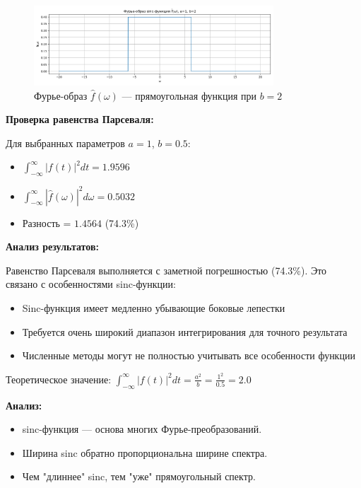 \begin{figure}[H]
    \centering
    \includegraphics[width=0.8\textwidth]{python/sinc_fourier_b2.png}
    \caption{Фурье-образ $\hat{f}(\omega)$ — прямоугольная функция при $b = 2$}
\end{figure}

\textbf{Проверка равенства Парсеваля:}

Для выбранных параметров $a = 1$, $b = 0.5$:
\begin{itemize}
    \item $\displaystyle \int_{-\infty}^{\infty} |f(t)|^2 dt = 1.9596$
    \item $\displaystyle \int_{-\infty}^{\infty} |\hat{f}(\omega)|^2 d\omega = 0.5032$
    \item Разность = $1.4564$ (74.3\%)
\end{itemize}

\textbf{Анализ результатов:}

Равенство Парсеваля выполняется с заметной погрешностью (74.3\%). Это связано с особенностями sinc-функции:
\begin{itemize}
    \item Sinc-функция имеет медленно убывающие боковые лепестки
    \item Требуется очень широкий диапазон интегрирования для точного результата
    \item Численные методы могут не полностью учитывать все особенности функции
\end{itemize}

Теоретическое значение: $\displaystyle \int_{-\infty}^{\infty} |f(t)|^2 dt = \frac{a^2}{b} = \frac{1^2}{0.5} = 2.0$

\textbf{Анализ:}

\begin{itemize}
    \item sinc-функция — основа многих Фурье-преобразований.
    \item Ширина sinc обратно пропорциональна ширине спектра.
    \item Чем "длиннее" sinc, тем "уже" прямоугольный спектр.
\end{itemize}

